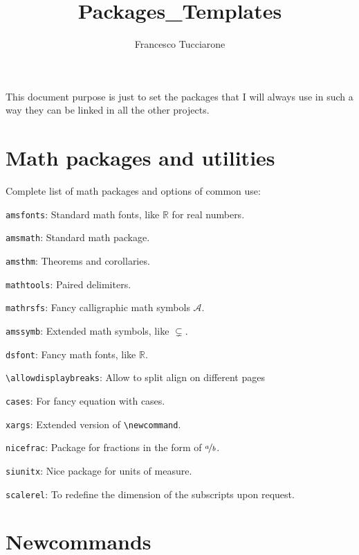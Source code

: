 \documentclass{article}
\title{Packages\_Templates}
\author{Francesco Tucciarone}
\begin{document}
\maketitle

This document purpose is just to set the packages that I will always use in such a way they can be linked in all the other projects.


\section{Math packages and utilities}
Complete list of math packages and options of common use:

\texttt{amsfonts}: Standard math fonts, like $\mathbb{R}$ for real numbers.

\texttt{amsmath}: Standard math package.

\texttt{amsthm}: Theorems and corollaries.

\texttt{mathtools}: Paired delimiters.

\texttt{mathrsfs}: Fancy calligraphic math symbols $\mathscr{A}$.

\texttt{amssymb}: Extended math symbols, like $\varsubsetneq$.

\texttt{dsfont}: Fancy math fonts, like $\mathds{R}$.

\texttt{\textbackslash allowdisplaybreaks}: Allow to split align on different pages

\texttt{cases}: For fancy equation with cases.

\texttt{xargs}: Extended version of \texttt{\textbackslash newcommand}.

\texttt{nicefrac}: Package for fractions in the form of $\nicefrac{a}{b}$.

\texttt{siunitx}: Nice package for units of measure.

\texttt{scalerel}: To redefine the dimension of the subscripts upon request.



\section{Newcommands}
\end{document}
